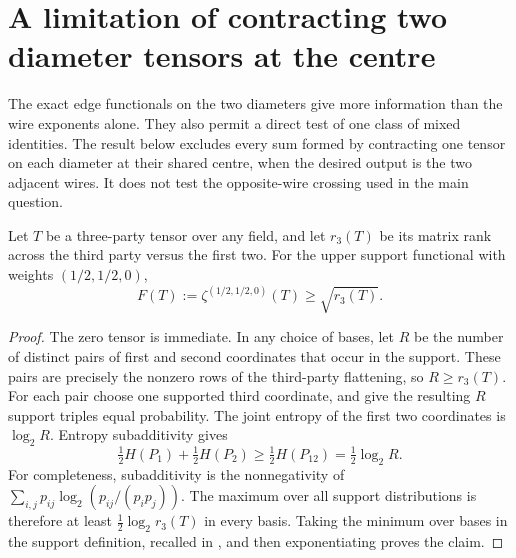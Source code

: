 \section{A limitation of contracting two diameter tensors at the centre}
\label{sec:mixed-lines}

The exact edge functionals on the two diameters give more information
than the wire exponents alone. They also permit a direct test of one
class of mixed identities. The result below excludes every sum formed
by contracting one tensor on each diameter at their shared centre,
when the desired output is the two adjacent wires. It does not test
the opposite-wire crossing used in the main question.

\begin{lemma}
\label{lem:edge-centre-rank}
Let $T$ be a three-party tensor over any field, and let $r_3(T)$
be its matrix rank across the third party versus the first two.
For the upper support functional with weights $(1/2,1/2,0)$,
\[
 F(T):=\zeta^{(1/2,1/2,0)}(T)\geq\sqrt{r_3(T)}.
\]
\end{lemma}
\begin{proof}
The zero tensor is immediate. In any choice of bases, let $R$ be the
number of distinct pairs of first and second coordinates that occur
in the support. These pairs are precisely the nonzero rows of the
third-party flattening, so $R\geq r_3(T)$. For each pair choose one
supported third coordinate, and give the resulting $R$ support
triples equal probability. The joint entropy of the first two
coordinates is $\log_2 R$. Entropy subadditivity gives
\[
 \tfrac12H(P_1)+\tfrac12H(P_2)
 \geq\tfrac12H(P_{12})=\tfrac12\log_2 R.
\]
For completeness, subadditivity is the nonnegativity of
$\sum_{i,j}p_{ij}\log_2(p_{ij}/(p_i p_j))$.
The maximum over all support distributions is therefore at least
$\tfrac12\log_2 r_3(T)$ in every basis. Taking the minimum over bases
in the support definition, recalled in \cite[equation (3), p.~3]{alp-edge},
and then exponentiating proves the claim.
\end{proof}

